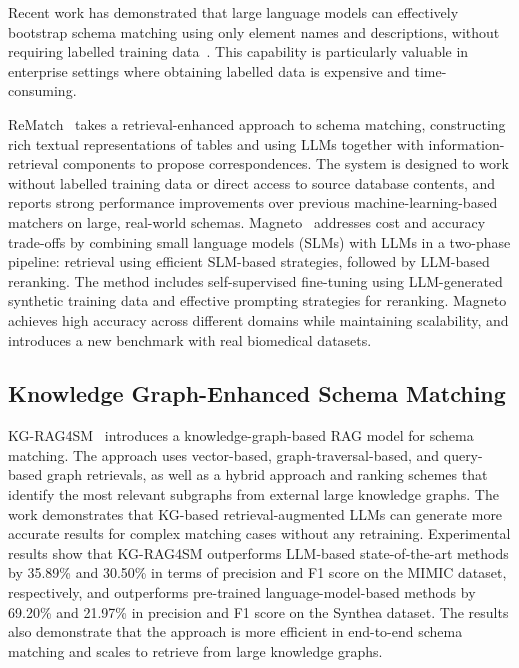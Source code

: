 Recent work has demonstrated that large language models can effectively bootstrap schema matching using only element names and descriptions, without requiring labelled training data~\cite{li2025llm}. This capability is particularly valuable in enterprise settings where obtaining labelled data is expensive and time-consuming.

ReMatch~\cite{sheetrit2024rematch} takes a retrieval-enhanced approach to schema matching, constructing rich textual representations of tables and using LLMs together with information-retrieval components to propose correspondences. The system is designed to work without labelled training data or direct access to source database contents, and reports strong performance improvements over previous machine-learning-based matchers on large, real-world schemas. Magneto~\cite{magneto2024} addresses cost and accuracy trade-offs by combining small language models (SLMs) with LLMs in a two-phase pipeline: retrieval using efficient SLM-based strategies, followed by LLM-based reranking. The method includes self-supervised fine-tuning using LLM-generated synthetic training data and effective prompting strategies for reranking. Magneto achieves high accuracy across different domains while maintaining scalability, and introduces a new benchmark with real biomedical datasets.

\subsection{Knowledge Graph-Enhanced Schema Matching}

KG-RAG4SM~\cite{ma2025kgrag} introduces a knowledge-graph-based RAG model for schema matching. The approach uses vector-based, graph-traversal-based, and query-based graph retrievals, as well as a hybrid approach and ranking schemes that identify the most relevant subgraphs from external large knowledge graphs. The work demonstrates that KG-based retrieval-augmented LLMs can generate more accurate results for complex matching cases without any retraining. Experimental results show that KG-RAG4SM outperforms LLM-based state-of-the-art methods by 35.89\% and 30.50\% in terms of precision and F1 score on the MIMIC dataset, respectively, and outperforms pre-trained language-model-based methods by 69.20\% and 21.97\% in precision and F1 score on the Synthea dataset. The results also demonstrate that the approach is more efficient in end-to-end schema matching and scales to retrieve from large knowledge graphs.


